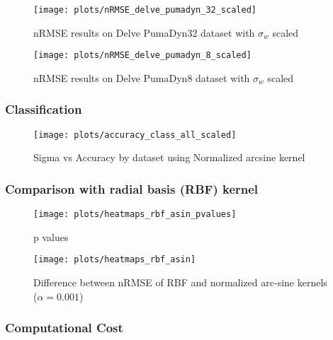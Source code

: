 \begin{figure}[H]
    \texttt{[image: plots/nRMSE\_delve\_pumadyn\_32\_scaled]}
    \caption{nRMSE results on Delve PumaDyn32 dataset with $\sigma_w$ scaled}
    \label{fig:nrmse-delve-pumadyn-32-scaled}
\end{figure}

\begin{figure}[H]
    \texttt{[image: plots/nRMSE\_delve\_pumadyn\_8\_scaled]}
    \caption{nRMSE results on Delve PumaDyn8 dataset with $\sigma_w$ scaled}
    \label{fig:nrmse-delve-asinnorm-pumadyn-8-scaled}
\end{figure}

\subsubsection{Classification}

\begin{figure}[H]
    \texttt{[image: plots/accuracy\_class\_all\_scaled]}
    \caption{Sigma vs Accuracy by dataset using Normalized arcsine kernel}%
    \label{fig:accuracy-asinnorm-scaled}
\end{figure}

\subsubsection{Comparison with radial basis (RBF) kernel}

\begin{figure}[H]
    \texttt{[image: plots/heatmaps\_rbf\_asin\_pvalues]}
    \caption{p values}
    \label{fig:paired-ttest-rbf-asinnorm}
\end{figure}

\begin{figure}[H]
    \texttt{[image: plots/heatmaps\_rbf\_asin]}
    \caption{Difference between nRMSE of RBF and normalized arc-sine kernels ($\alpha=0.001$)}
    \label{fig:paired-ttest-rbf-asinnorm-diff}
\end{figure}

\subsubsection{Computational Cost}
